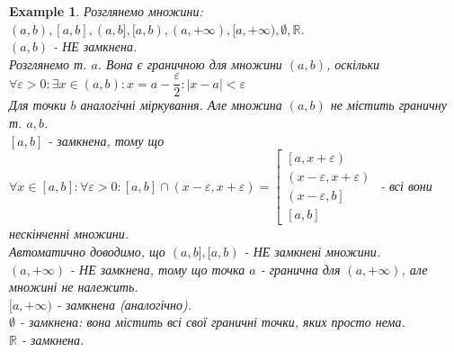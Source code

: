 \documentclass[a4paper, 14pt]{article}
\theoremstyle{theoremdd}
\theoremstyle{theoremdd}
\theoremstyle{theoremdd}
\theoremstyle{theoremdd}
\newtheorem{example}[theorem]{Example}
\theoremstyle{theoremdd}
\theoremstyle{theoremdd}
\theoremstyle{theoremdd}
\theoremstyle{theoremdd}
\begin{document}
\begin{example}
Розглянемо множини: $(a,b), [a,b], (a,b], [a,b), (a,+\infty), [a,+\infty), \emptyset, \mathbb{R}$.\\
$(a,b)$ - НЕ замкнена.\\
Розглянемо т. $a$. Вона є граничною для множини $(a,b)$, оскільки\\
$\forall \varepsilon > 0: \exists x \in (a,b): x = a - \dfrac{\varepsilon}{2}: |x-a| < \varepsilon$\\
Для точки $b$ аналогічні міркування. Але множина $(a,b)$ не містить граничну т. $a,b$.
\bigskip \\

$[a,b]$ - замкнена, тому що $\forall x \in [a,b]: \forall \varepsilon > 0: [a,b] \cap (x-\varepsilon,x+\varepsilon) = \left[
\begin{gathered}
\left[a,x+\varepsilon \right) \\
\left(x-\varepsilon, x + \varepsilon \right) \\
\left(x - \varepsilon, b\right] \\
\left[a,b\right]
\end{gathered}
 \right.$ - всі вони нескінченні множини.
\bigskip \\
Автоматично доводимо, що $(a,b], [a,b)$ - НЕ замкнені множини.
\bigskip \\
$(a,+\infty)$ - НЕ замкнена, тому що точка $a$ - гранична для $(a,+\infty)$, але множині не належить.
\bigskip \\
$[a,+\infty)$ - замкнена (аналогічно).
\bigskip \\
$\emptyset$ - замкнена: вона містить всі свої граничні точки, яких просто нема.
\bigskip \\
$\mathbb{R}$ - замкнена.
\end{example}
\end{document}
